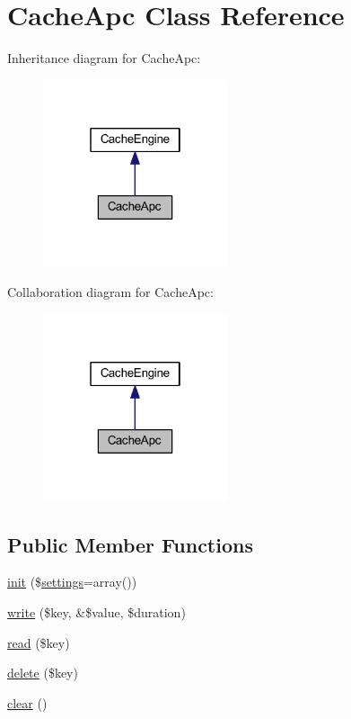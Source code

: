 \hypertarget{class_cache_apc}{\section{Cache\-Apc Class Reference}
\label{class_cache_apc}
}


Inheritance diagram for Cache\-Apc\-:
\nopagebreak
\begin{figure}[H]
\begin{center}
\leavevmode
\includegraphics[width=154pt]{class_cache_apc__inherit__graph}
\end{center}
\end{figure}


Collaboration diagram for Cache\-Apc\-:
\nopagebreak
\begin{figure}[H]
\begin{center}
\leavevmode
\includegraphics[width=154pt]{class_cache_apc__coll__graph}
\end{center}
\end{figure}
\subsection*{Public Member Functions}
\begin{DoxyCompactItemize}
\item 
\hyperlink{class_cache_apc_add47463221d657541f10f2ca5ec218d8}{init} (\$\hyperlink{class_cache_engine_ad7354383714c6ae99d6ee1bfb95ab49f}{settings}=array())
\item 
\hyperlink{class_cache_apc_a0e72b4e1d3c5ff461155883cad18358d}{write} (\$key, \&\$value, \$duration)
\item 
\hyperlink{class_cache_apc_a4c50c958c469c08bba0c0ccb710ca8af}{read} (\$key)
\item 
\hyperlink{class_cache_apc_aa74a2edd6f3cbb5c5353f7faa97b6d70}{delete} (\$key)
\item 
\hyperlink{class_cache_apc_aa821bec12eaa7e0f649397c9675ff505}{clear} ()
\end{DoxyCompactItemize}
